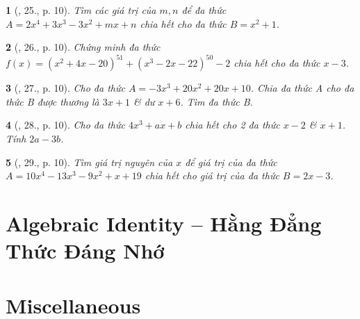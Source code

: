 \documentclass{article}
\newtheorem{baitoan}{}
\begin{document}
\begin{baitoan}[\cite{Tuyen_Toan_8}, 25., p. 10]
	Tìm các giá trị của $m,n$ để đa thức $A = 2x^4 + 3x^3 - 3x^2 + mx + n$ chia hết cho đa thức $B = x^2 + 1$.
\end{baitoan}

\begin{baitoan}[\cite{Tuyen_Toan_8}, 26., p. 10]
	Chứng minh đa thức $f(x) = (x^2 + 4x - 20)^{51} + (x^3 - 2x - 22)^{50} - 2$ chia hết cho đa thức $x - 3$.
\end{baitoan}

\begin{baitoan}[\cite{Tuyen_Toan_8}, 27., p. 10]
	Cho đa thức $A = -3x^3 + 20x^2 + 20x + 10$. Chia đa thức A cho đa thức B được thương là $3x + 1$ \& dư $x + 6$. Tìm đa thức B.
\end{baitoan}

\begin{baitoan}[\cite{Tuyen_Toan_8}, 28., p. 10]
	Cho đa thức $4x^3 + ax + b$ chia hết cho 2 đa thức $x - 2$ \& $x + 1$. Tính $2a - 3b$.
\end{baitoan}

\begin{baitoan}[\cite{Tuyen_Toan_8}, 29., p. 10]
	Tìm giá trị nguyên của $x$ để giá trị của đa thức $A = 10x^4 - 13x^3 - 9x^2 + x + 19$ chia hết cho giá trị của đa thức $B = 2x - 3$.
\end{baitoan}


\section{Algebraic Identity -- Hằng Đẳng Thức Đáng Nhớ}


\section{Miscellaneous}


\printbibliography[heading=bibintoc]
	
\end{document}
